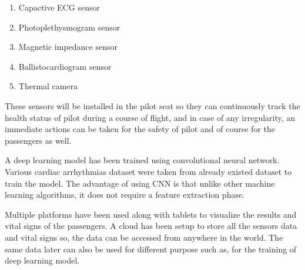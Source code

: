 \begin{enumerate}
	\item Capactive ECG sensor
	\item Photoplethysmogram sensor
	\item Magnetic impedance sensor
	\item Ballistocardiogram sensor
	\item Thermal camera
\end{enumerate}

These sensors will be installed in the pilot seat so they can continuously track the health status of pilot during a course of flight, and in case of any irregularity, an immediate actions can be taken for the safety of pilot and of course for the passengers as well.

A deep learning model has been trained using convolutional neural network.  Various cardiac arrhythmias dataset were taken from already existed dataset to train the model. The advantage of using CNN is that unlike other machine learning algorithms, it does not require a feature extraction phase.

Multiple platforms have been used along with tablets to visualize the results and vital signs of the passengers. A cloud has been setup to store all the sensors data and vital signs so, the data can be accessed from anywhere in the world.
The same data later can also be used for different purpose such as, for the training of deep learning model.


